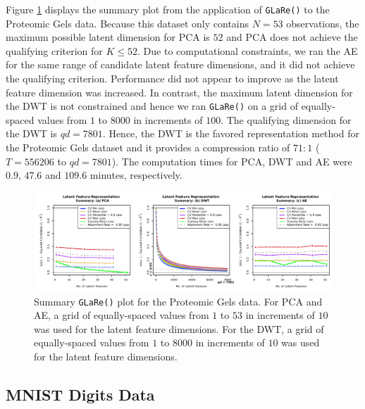 Figure \ref{fig:gels-results} displays the summary plot from the application of \texttt{GLaRe()} to the Proteomic Gels data.
Because this dataset only contains $N=53$ observations, the maximum possible latent dimension for PCA is $52$ and PCA does not achieve the qualifying criterion for $K \leq 52$.
Due to computational constraints, we ran the AE for the same range of candidate latent feature dimensions, and it did not achieve the qualifying criterion.
Performance did not appear to improve as the latent feature dimension was increased.
In contrast, the maximum latent dimension for the DWT is not constrained and hence we ran \texttt{GLaRe()} on a grid of equally-spaced values from $1$ to $8000$ in increments of $100$.
The qualifying dimension for the DWT is $qd=7801$.
Hence, the DWT is the favored representation method for the Proteomic Gels dataset and it provides a compression ratio of $71:1$ ($T = 556206$ to $qd = 7801$).
The computation times for PCA, DWT and AE were $0.9$, $47.6$ and $109.6$ minutes, respectively.


\begin{figure}
    \centering
    \includegraphics[width=1\linewidth]{figures/gels-results.pdf}
    \caption{Summary \texttt{GLaRe()} plot for the Proteomic Gels data. For PCA and AE, a grid of equally-spaced values from $1$ to $53$ in increments of $10$ was used for the latent feature dimensions.
    For the DWT,  a grid of equally-spaced values from $1$ to $8000$ in increments of $10$ was used for the latent feature dimensions.}
    \label{fig:gels-results}
\end{figure}


\subsection{MNIST Digits Data}

